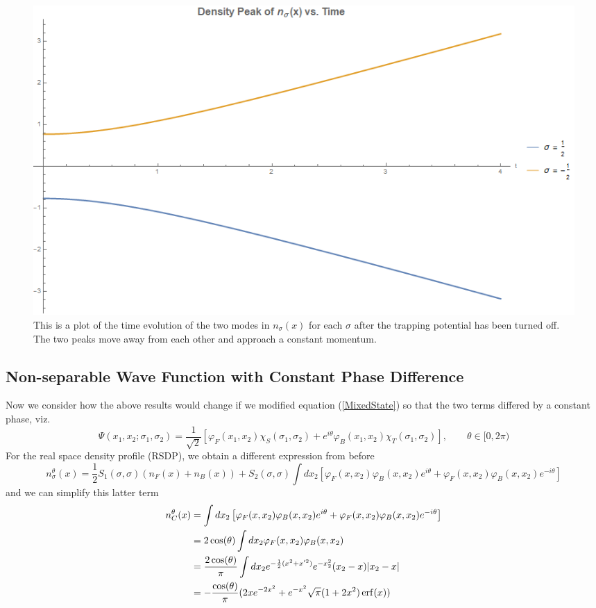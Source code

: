 \documentclass[onecolumn,english,aps,pra]{revtex4}
\begin{document}
\begin{figure}[H]
\center	
\includegraphics[scale=0.45]{../Plots/DensityPeaks}
\caption{This is a plot of the time evolution of the two modes in $n_\sigma(x)$ for each $\sigma$ after the trapping potential has been turned off. The two peaks move away from each other and approach a constant momentum.}
\label{DensityPeaks}
\end{figure}

\subsection{Non-separable Wave Function with Constant Phase Difference}

Now we consider how the above results would change if we modified equation (\ref{MixedState}) so that the two terms differed by a constant phase, viz.
\begin{equation}
\Psi(x_1, x_2; \sigma_1, \sigma_2) = \frac{1}{\sqrt{2}}\left[\varphi_F(x_1, x_2) \chi_S(\sigma_1, \sigma_2) + e^{i\theta	}\varphi_B(x_1,x_2) \chi_T(\sigma_1, \sigma_2)\right], \qquad \theta \in [0,2\pi)
\end{equation}
%
For the real space density profile (RSDP), we obtain a different expression from before
\[
n_{\sigma}^\theta(x) = \frac{1}{2}S_1(\sigma, \sigma)(n_F(x) + n_B(x)) +   S_2(\sigma,\sigma) \int dx_2 
\left[ \varphi_F(x,x_2)\varphi_B(x,x_2) e^{i\theta} + \varphi_F(x,x_2)\varphi_B(x,x_2) e^{-i\theta} \right]
\]
and we can simplify this latter term
\begin{align*}
n_C^\theta(x) & =  \int dx_2 
\left[ \varphi_F(x,x_2)\varphi_B(x,x_2) e^{i\theta} + \varphi_F(x,x_2)\varphi_B(x,x_2) e^{-i\theta} \right]\\
& = 2 \cos (\theta) \int dx_2 \varphi_F(x,x_2)\varphi_B(x,x_2)\\
& = \frac{2 \cos (\theta)}{\pi} \int dx_2 e^{-\frac{1}{2}(x^2 + x'^2)} e^{-x_2^2} (x_2 -x) |x_2 - x|\\
& = -\frac{\cos (\theta)}{\pi} (2xe^{-2x^2} + e^{-x^2}\sqrt{\pi} (1 + 2 x^2) \erf(x)) 
\end{align*}
\end{document}
